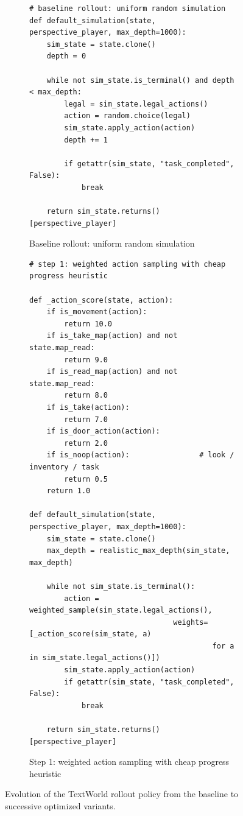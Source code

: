 \documentclass{article}
\begin{document}
\begin{figure}[p]
  \centering

  \begin{subfigure}[t]{0.98\textwidth}
    \centering
    \caption{Baseline rollout: uniform random simulation}
\begin{lstlisting}[basicstyle=\ttfamily\scriptsize]
# baseline rollout: uniform random simulation
def default_simulation(state, perspective_player, max_depth=1000):
    sim_state = state.clone()
    depth = 0

    while not sim_state.is_terminal() and depth < max_depth:
        legal = sim_state.legal_actions()
        action = random.choice(legal)
        sim_state.apply_action(action)
        depth += 1

        if getattr(sim_state, "task_completed", False):
            break

    return sim_state.returns()[perspective_player]
\end{lstlisting}
  \end{subfigure}

  \vspace{0.35cm}
  \begin{subfigure}[t]{0.98\textwidth}
    \centering
    \caption{Step 1: weighted action sampling with cheap progress heuristic}
\begin{lstlisting}[basicstyle=\ttfamily\scriptsize]
# step 1: weighted action sampling with cheap progress heuristic

def _action_score(state, action):
    if is_movement(action):
        return 10.0
    if is_take_map(action) and not state.map_read:
        return 9.0
    if is_read_map(action) and not state.map_read:
        return 8.0
    if is_take(action):
        return 7.0
    if is_door_action(action):
        return 2.0
    if is_noop(action):                # look / inventory / task
        return 0.5
    return 1.0

def default_simulation(state, perspective_player, max_depth=1000):
    sim_state = state.clone()
    max_depth = realistic_max_depth(sim_state, max_depth)

    while not sim_state.is_terminal():
        action = weighted_sample(sim_state.legal_actions(),
                                 weights=[_action_score(sim_state, a)
                                          for a in sim_state.legal_actions()])
        sim_state.apply_action(action)
        if getattr(sim_state, "task_completed", False):
            break

    return sim_state.returns()[perspective_player]
\end{lstlisting}
  \end{subfigure}

  \caption{Evolution of the TextWorld rollout policy from the baseline to successive optimized variants.}
  \label{fig:textworld-code}
\end{figure}
\end{document}
